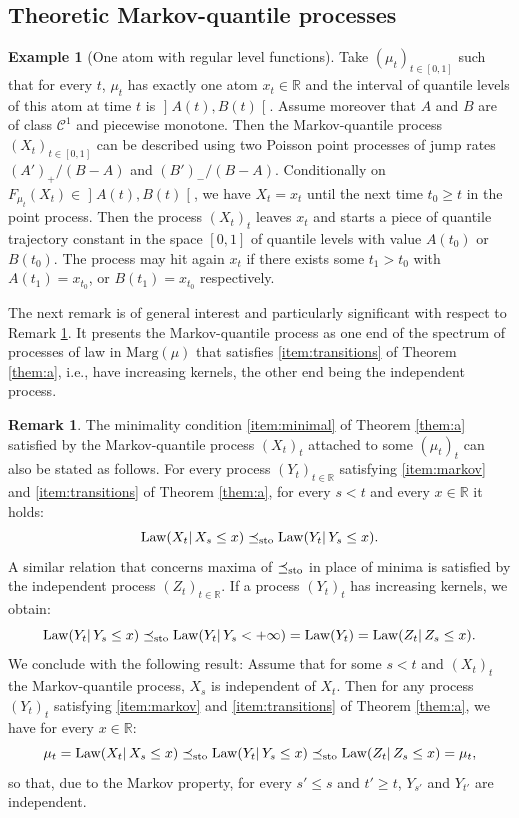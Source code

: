 \documentclass[11pt]{article}
\newcommand{\ie}{i.e.,\xspace}
\newcommand{\Subsection}{\subsection}
\theoremstyle{plain}
\theoremstyle{definition}
\newtheorem{rem}[them]{Remark}
\newtheorem{ex}[them]{Example}
\newcommand{\ma}{\mathrm{Marg}}
\newcommand{\R}{\mathbb{R}}
\newcommand{\law}{\operatorname{Law}}
\newcommand{\leqs}{\preceq_{\text{\rm sto}}}
\newcommand{\op}{\mathopen}
\newcommand{\clo}{\mathclose}
\begin{document}
\Subsection{Theoretic Markov-quantile processes}

\begin{ex}[One atom with regular level functions]\label{ex:swimming_atom}
Take $(\mu_t)_{t\in{[0,1]}}$ such that for every $t$, $\mu_t$ has exactly one atom $x_t\in \R$ and the interval of quantile levels of this atom at time $t$ is $\op]A(t),B(t)\clo[$. Assume moreover that $A$ and $B$ are of class $\mathcal{C}^1$ and piecewise monotone. Then the Markov-quantile process $(X_t)_{t\in [0,1]}$ can be described using two Poisson point processes of jump rates $(A')_+/(B-A)$ and $(B')_-/(B-A)$. Conditionally on $F_{\mu_t}(X_t)\in \op]A(t), B(t)\clo[$, we have $X_t=x_t$ until the next time $t_0\geq t$ in the point process. Then the process $(X_t)_t$ leaves $x_t$ and starts a piece of quantile trajectory constant in the space $[0,1]$ of quantile levels with value $A(t_0)$ or $B(t_0)$. The process may hit again $x_t$ if there exists some $t_1>t_0$ with $A(t_1)=x_{t_0}$, or $B(t_1)=x_{t_0}$ respectively.
\end{ex}

The next remark is of general interest and particularly significant with respect to Remark \ref{rem:a_bouger}. It presents the Markov-quantile process as one end of the spectrum of processes of law in $\ma(\mu)$ that satisfies \eqref{item:transitions} of Theorem \ref{them:a}, \ie have increasing kernels, the other end being the independent process.

\begin{rem}\label{rem:a_bouger}
The minimality condition \eqref{item:minimal} of Theorem \ref{them:a} satisfied by the Markov-quantile process $(X_t)_t$ attached to some $(\mu_t)_t$ can also be stated as follows. For every process $(Y_t)_{t\in \R}$ satisfying \eqref{item:markov} and \eqref{item:transitions} of Theorem \ref{them:a}, for every $s<t$ and every $x\in \R$ it holds:
\[
\law(X_t|\,X_s\leq x)\leqs \law(Y_t|\,Y_s\leq x).
\]
A similar relation that concerns maxima of $\leqs$ in place of minima is satisfied by the independent process $(Z_t)_{t\in \R}$. If a process $(Y_t)_t$ has increasing kernels, we obtain:
\[\law(Y_t|\,Y_s\leq x)\leqs \law(Y_t|\,Y_s< +\infty)=\law(Y_t)=\law(Z_t|\,Z_s\leq x).\]
We conclude with the following result: Assume that for some $s<t$ and $(X_t)_t$ the Markov-quantile process, $X_s$ is independent of $X_t$. Then for any process $(Y_t)_t$ satisfying \eqref{item:markov} and \eqref{item:transitions} of Theorem \ref{them:a}, we have for every $x\in\R$:\vspace*{-3pt}
\[
\mu_t=\law(X_t|\,X_s\leq x)\leqs \law(Y_t|\,Y_s\leq x) \leqs \law(Z_t|\,Z_s\leq x)=\mu_t,
\]
so that, due to the Markov property, for every $s'\leq s$ and $t'\geq t$, $Y_{s'}$ and $Y_{t'}$ are independent.
\end{rem}
\end{document}
